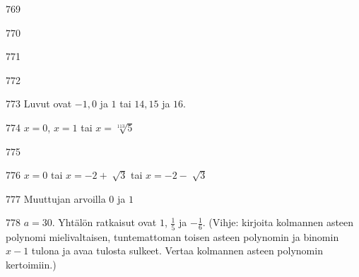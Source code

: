 \begin{Vastaus}{769}
    
\end{Vastaus}
\begin{Vastaus}{770}
\end{Vastaus}
\begin{Vastaus}{771}
    
\end{Vastaus}
\begin{Vastaus}{772}
    
\end{Vastaus}
\begin{Vastaus}{773}
	Luvut ovat $-1, 0$ ja $1$ tai $14, 15$ ja $16$.
    
\end{Vastaus}
\begin{Vastaus}{774}
		$x = 0$, $x = 1$ tai $x = \sqrt[113]{5}$
	
\end{Vastaus}
\begin{Vastaus}{775}
    
\end{Vastaus}
\begin{Vastaus}{776}
	$x=0$ tai $x=-2 + \sqrt[]{3}$ tai $x=-2 - \sqrt[]{3}$
	
\end{Vastaus}
\begin{Vastaus}{777}
Muuttujan arvoilla $0$ ja $1$
	
\end{Vastaus}
\begin{Vastaus}{778}
      $a=30$. Yhtälön ratkaisut ovat $1$, $\frac{1}{5}$ ja $-\frac{1}{6}$. (Vihje: kirjoita kolmannen asteen polynomi mielivaltaisen, tuntemattoman toisen asteen polynomin ja binomin $x-1$ tulona ja avaa tulosta sulkeet. Vertaa kolmannen asteen polynomin kertoimiin.)
    
\end{Vastaus}
